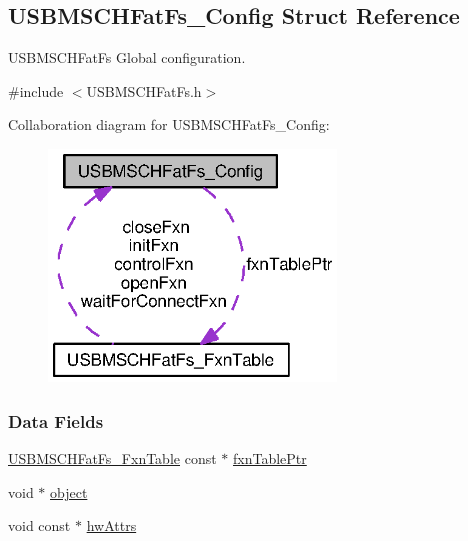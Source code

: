 \subsection{U\+S\+B\+M\+S\+C\+H\+Fat\+Fs\+\_\+\+Config Struct Reference}
\label{struct_u_s_b_m_s_c_h_fat_fs___config}


U\+S\+B\+M\+S\+C\+H\+Fat\+Fs Global configuration.  




{\ttfamily \#include $<$U\+S\+B\+M\+S\+C\+H\+Fat\+Fs.\+h$>$}



Collaboration diagram for U\+S\+B\+M\+S\+C\+H\+Fat\+Fs\+\_\+\+Config\+:
\nopagebreak
\begin{figure}[H]
\begin{center}
\leavevmode
\includegraphics[width=217pt]{struct_u_s_b_m_s_c_h_fat_fs___config__coll__graph}
\end{center}
\end{figure}
\subsubsection*{Data Fields}
\begin{DoxyCompactItemize}
\item 
\hyperlink{struct_u_s_b_m_s_c_h_fat_fs___fxn_table}{U\+S\+B\+M\+S\+C\+H\+Fat\+Fs\+\_\+\+Fxn\+Table} const $\ast$ \hyperlink{struct_u_s_b_m_s_c_h_fat_fs___config_a3a4cc2246f53d8c7aca196c20feeed7c}{fxn\+Table\+Ptr}
\item 
void $\ast$ \hyperlink{struct_u_s_b_m_s_c_h_fat_fs___config_ac7a9ff09f69fded788e34195c234f562}{object}
\item 
void const $\ast$ \hyperlink{struct_u_s_b_m_s_c_h_fat_fs___config_ab91b03539dc769508dd811ab7b0c1e82}{hw\+Attrs}
\end{DoxyCompactItemize}


